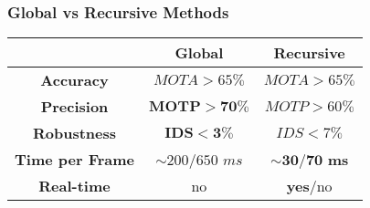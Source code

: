 \begin{frame}
	\frametitle{Global vs Recursive Methods}
	
	\Large
	
	\vspace{0.1cm}
	
	\begin{table}[!t]
		\centering
		\renewcommand{\arraystretch}{1.15}
		\begin{tabular}{ c | c | c | }
			\cline{2-3}
			& \textbf{Global} & \textbf{Recursive} \\ \hline
			
			\multicolumn{1}{|c|}{\textbf{Accuracy}} & $ MOTA > 65\% $ & $ MOTA > 65\% $ \\ \hline
			\multicolumn{1}{|c|}{\textbf{Precision}} & $ \mathbf{MOTP > 70\%} $ & $ MOTP > 60\% $ \\
			\hline
			\multicolumn{1}{|c|}{\textbf{Robustness}} & $ \mathbf{IDS < 3\%} $ & $ IDS < 7\% $ \\
			\hline
			\multicolumn{1}{|c|}{\textbf{Time per Frame}} & $ \sim 200/650 $ $ ms $ &
			$ \mathbf{\boldsymbol{\sim} 30/70} $ \textbf{ms} \\ \hline
			\multicolumn{1}{|c|}{\textbf{Real-time}} & no & \textbf{yes}/no \\ \hline
		\end{tabular}
	\end{table}
\end{frame}
